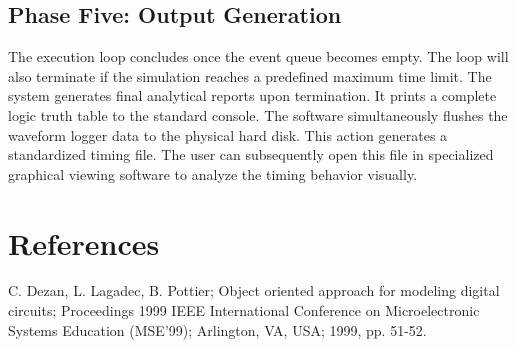 \documentclass[12pt, a4paper]{article}
\begin{document}
\subsection{Phase Five: Output Generation}
The execution loop concludes once the event queue becomes empty. The loop will also terminate if the simulation reaches a predefined maximum time limit. The system generates final analytical reports upon termination. It prints a complete logic truth table to the standard console. The software simultaneously flushes the waveform logger data to the physical hard disk. This action generates a standardized timing file. The user can subsequently open this file in specialized graphical viewing software to analyze the timing behavior visually.
\section{References}

C. Dezan, L. Lagadec, B. Pottier; Object oriented approach for modeling digital circuits; Proceedings 1999 IEEE International Conference on Microelectronic Systems Education (MSE'99); Arlington, VA, USA; 1999, pp. 51-52.
\end{document}
